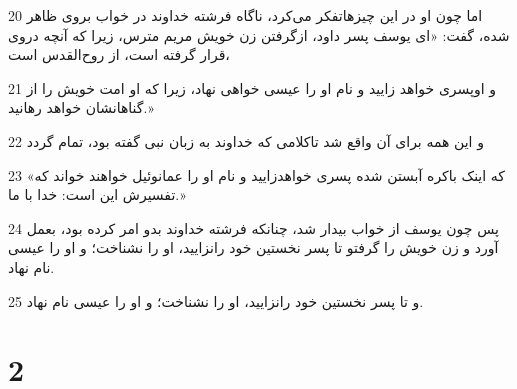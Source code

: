\par 20 اما چون او در این چیزهاتفکر می‌کرد، ناگاه فرشته خداوند در خواب بروی ظاهر شده، گفت: «ای یوسف پسر داود، ازگرفتن زن خویش مریم مترس، زیرا که آنچه دروی قرار گرفته است، از روح‌القدس است،
\par 21 و اوپسری خواهد زایید و نام او را عیسی خواهی نهاد، زیرا که او امت خویش را از گناهانشان خواهد رهانید.»
\par 22 و این همه برای آن واقع شد تاکلامی که خداوند به زبان نبی گفته بود، تمام گردد
\par 23 «که اینک باکره آبستن شده پسری خواهدزایید و نام او را عمانوئیل خواهند خواند که تفسیرش این است: خدا با ما.»
\par 24 پس چون یوسف از خواب بیدار شد، چنانکه فرشته خداوند بدو امر کرده بود، بعمل آورد و زن خویش را گرفتو تا پسر نخستین خود رانزایید، او را نشناخت؛ و او را عیسی نام نهاد.
\par 25 و تا پسر نخستین خود رانزایید، او را نشناخت؛ و او را عیسی نام نهاد.

\chapter{2}


